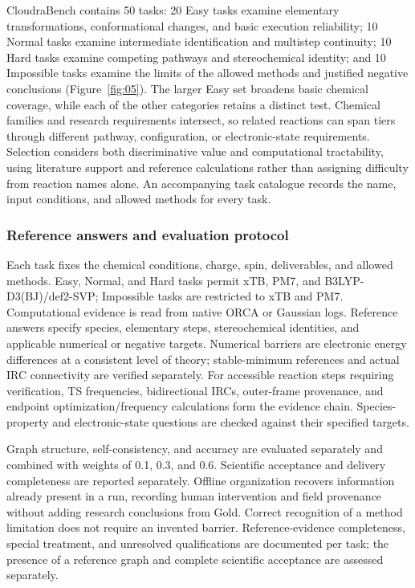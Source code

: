 CloudraBench contains 50 tasks: 20 Easy tasks examine elementary transformations, conformational changes, and basic execution reliability; 10 Normal tasks examine intermediate identification and multistep continuity; 10 Hard tasks examine competing pathways and stereochemical identity; and 10 Impossible tasks examine the limits of the allowed methods and justified negative conclusions (Figure~\ref{fig:05}). The larger Easy set broadens basic chemical coverage, while each of the other categories retains a distinct test. Chemical families and research requirements intersect, so related reactions can span tiers through different pathway, configuration, or electronic-state requirements. Selection considers both discriminative value and computational tractability, using literature support and reference calculations rather than assigning difficulty from reaction names alone. An accompanying task catalogue records the name, input conditions, and allowed methods for every task.

\subsubsection{Reference answers and evaluation protocol}

Each task fixes the chemical conditions, charge, spin, deliverables, and allowed methods. Easy, Normal, and Hard tasks permit xTB, PM7, and B3LYP-D3(BJ)/def2-SVP; Impossible tasks are restricted to xTB and PM7. Computational evidence is read from native ORCA or Gaussian logs. Reference answers specify species, elementary steps, stereochemical identities, and applicable numerical or negative targets. Numerical barriers are electronic energy differences at a consistent level of theory; stable-minimum references and actual IRC connectivity are verified separately. For accessible reaction steps requiring verification, TS frequencies, bidirectional IRCs, outer-frame provenance, and endpoint optimization/frequency calculations form the evidence chain. Species-property and electronic-state questions are checked against their specified targets.

Graph structure, self-consistency, and accuracy are evaluated separately and combined with weights of 0.1, 0.3, and 0.6. Scientific acceptance and delivery completeness are reported separately. Offline organization recovers information already present in a run, recording human intervention and field provenance without adding research conclusions from Gold. Correct recognition of a method limitation does not require an invented barrier. Reference-evidence completeness, special treatment, and unresolved qualifications are documented per task; the presence of a reference graph and complete scientific acceptance are assessed separately.

